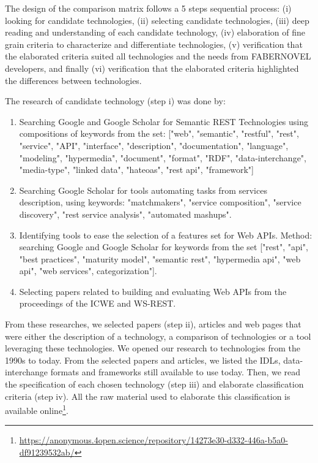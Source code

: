 The design of the comparison matrix follows a 5 steps sequential process: (i) looking for candidate technologies, (ii) selecting candidate technologies, (iii) deep reading and understanding of each candidate technology, (iv) elaboration of fine grain criteria to characterize and differentiate technologies, (v) verification that the elaborated criteria suited all technologies and the needs from FABERNOVEL developers, and finally (vi) verification that the elaborated criteria highlighted the differences between technologies.

The research of candidate technology (step i) was done by:

\begin{enumerate}
    \item Searching Google and Google Scholar for Semantic REST Technologies using compositions of keywords from the set: ["web", "semantic", "restful", "rest", "service", "API", "interface", "description", "documentation", "language", "modeling", "hypermedia", "document", "format", "RDF", "data-interchange", "media-type", "linked data", "hateoas", "rest api", "framework"]
    \item Searching Google Scholar for tools automating tasks from services description, using keywords: "matchmakers", "service composition", "service discovery", "rest service analysis", "automated mashups".
    \item Identifying tools to ease the selection of a features set for Web APIs. Method: searching Google and Google Scholar for keywords from the set ["rest", "api", "best practices", "maturity model", "semantic rest", "hypermedia api", "web api", "web services", categorization"].
    \item Selecting papers related to building and evaluating Web APIs from the proceedings of the ICWE and WS-REST.
\end{enumerate}

From these researches, we selected papers (step ii), articles and web pages that were either the description of a technology, a comparison of technologies or a tool leveraging these technologies. We opened our research to technologies from the 1990s to today. 
From the selected papers and articles, we listed the IDLs, data-interchange formats and frameworks still available to use today. %
Then, we read the specification of each chosen technology (step iii) and elaborate classification criteria (step iv). All the raw material used to elaborate this classification is available online\footnote{\url{https://anonymous.4open.science/repository/14273e30-d332-446a-b5a0-df91239532ab/}}. 

